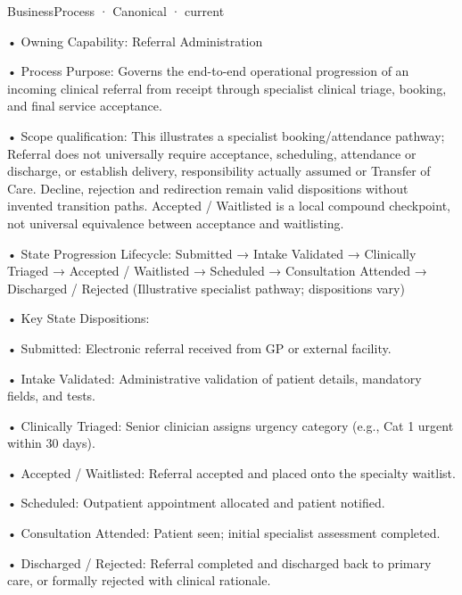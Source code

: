 \label{element:cfb714e9320647ffa1dffc80dddd01d9}
{\small BusinessProcess · Canonical · current}\par

•
Owning Capability: Referral Administration



•
Process Purpose: Governs the end-to-end operational progression of an incoming clinical referral from receipt through specialist clinical triage, booking, and final service acceptance.



•
Scope qualification: This illustrates a specialist booking/attendance pathway; Referral does not universally require acceptance, scheduling, attendance or discharge, or establish delivery, responsibility actually assumed or Transfer of Care. Decline, rejection and redirection remain valid dispositions without invented transition paths. Accepted / Waitlisted is a local compound checkpoint, not universal equivalence between acceptance and waitlisting.



•
State Progression Lifecycle: Submitted → Intake Validated → Clinically Triaged → Accepted / Waitlisted → Scheduled → Consultation Attended → Discharged / Rejected   (Illustrative specialist pathway; dispositions vary)



•
Key State Dispositions:



•
Submitted: Electronic referral received from GP or external facility.



•
Intake Validated: Administrative validation of patient details, mandatory fields, and tests.



•
Clinically Triaged: Senior clinician assigns urgency category (e.g., Cat 1 urgent within 30 days).



•
Accepted / Waitlisted: Referral accepted and placed onto the specialty waitlist.



•
Scheduled: Outpatient appointment allocated and patient notified.



•
Consultation Attended: Patient seen; initial specialist assessment completed.



•
Discharged / Rejected: Referral completed and discharged back to primary care, or formally rejected with clinical rationale.



